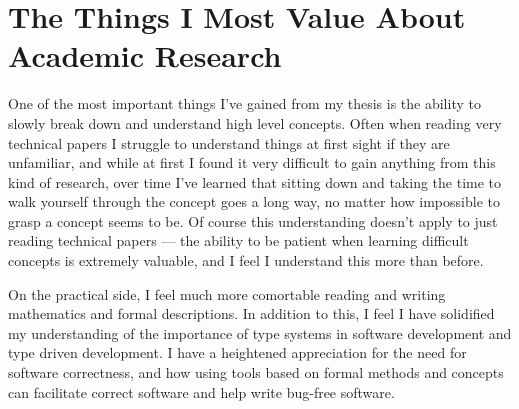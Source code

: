\section{The Things I Most Value About Academic Research}

One of the most important things I've gained from my thesis is the ability to slowly break down and understand high level
concepts. Often when reading very technical papers I struggle to understand things at first sight if they are unfamiliar,
and while at first I found it very difficult to gain anything from this kind of research, over time I've learned that
sitting down and taking the time to walk yourself through the concept goes a long way, no matter how impossible to grasp
a concept seems to be. Of course this understanding doesn't apply to just reading technical papers --- the ability to
be patient when learning difficult concepts is extremely valuable, and I feel I understand this more than before.

On the practical side, I feel much more comortable reading and writing mathematics and formal descriptions. In addition to
this, I feel I have solidified my understanding of the importance of type systems in software development and
type driven development. I have a heightened appreciation for the need for software correctness, and how using
tools based on formal methods and concepts can facilitate correct software and help write bug-free software.